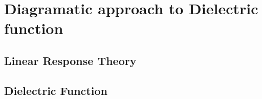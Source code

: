 \documentclass[twocolumn,showpacs,prb,amsfonts,amsmath,amssymb,floatfix,groupedaddress]{ltjsarticle} %
\begin{document}
\section{Diagramatic approach to Dielectric function}
\subsection{Linear Response Theory}
\subsection{Dielectric Function}




\end{document}
